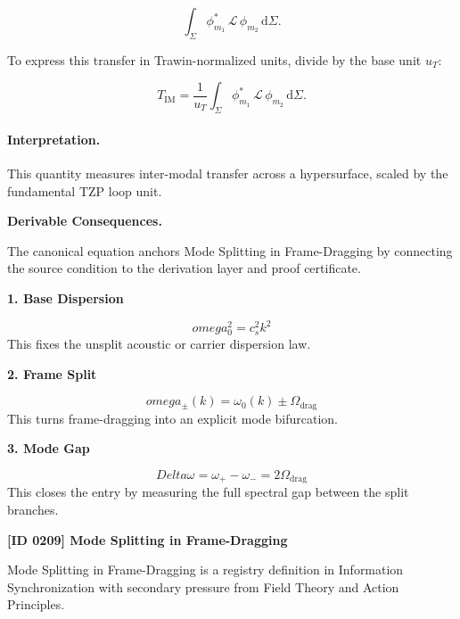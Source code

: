 \begin{equation}
\int_{\Sigma}
\phi_{m_1}^{*}
\,\mathcal{L}\,
\phi_{m_2}
\,\mathrm{d}\Sigma .
\end{equation}

To express this transfer in Trawin-normalized units, divide by the base unit $u_T$:

\begin{equation}
T_{\mathrm{IM}}
=
\frac{1}{u_T}
\int_{\Sigma}
\phi_{m_1}^{*}
\,\mathcal{L}\,
\phi_{m_2}
\,\mathrm{d}\Sigma .
\end{equation}

\paragraph{Interpretation.}
This quantity measures inter-modal transfer across a hypersurface, scaled by the fundamental TZP loop unit.

\par\vspace{0.35em}
\noindent\textbf{Derivable Consequences.}\quad
\begingroup
\footnotesize
\raggedright
The canonical equation anchors Mode Splitting in Frame-Dragging by connecting the source condition to the derivation layer and proof certificate.
\par\endgroup

\noindent\textbf{1. Base Dispersion}\par
\[
omega_0^2 = c_s^2 k^2
\]
\noindent This fixes the unsplit acoustic or carrier dispersion law.\par
\noindent\textbf{2. Frame Split}\par
\[
omega_{\pm}(k) = \omega_0(k) \pm \Omega_{\mathrm{drag}}
\]
\noindent This turns frame-dragging into an explicit mode bifurcation.\par
\noindent\textbf{3. Mode Gap}\par
\[
Delta \omega = \omega_{+} - \omega_{-} = 2\Omega_{\mathrm{drag}}
\]
\noindent This closes the entry by measuring the full spectral gap between the split branches.\par

\clearpage
\noindent\textbf{[ID 0209] Mode Splitting in Frame-Dragging}\par
\vspace{0.35em}
\begingroup\small
{}
Mode Splitting in Frame-Dragging is a registry definition in Information Synchronization with secondary pressure from Field Theory and Action Principles.

